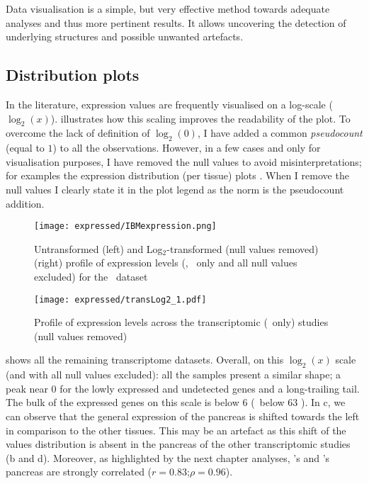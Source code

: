 Data visualisation is a simple, but very effective method
towards adequate analyses and thus more pertinent results.
It allows uncovering the detection of underlying structures
and possible unwanted artefacts.

\subsection{Distribution plots}\label{subsec:distribPlot}
\vspace{-0.2in}
In the literature, expression values are frequently
visualised on a log-scale ($\log_{2}(x)$).
 illustrates how
this scaling improves the readability of the plot.
To overcome the lack of definition of $\log_{2}(0)$,
I have added a common \emph{pseudocount} (equal to $1$)
to all the observations.
However, in a few cases and only for visualisation purposes,
I have removed the null values to avoid misinterpretations;
for examples the expression distribution (per tissue) plots
.
When I remove the null values I clearly state it in the plot legend
as the norm is the pseudocount addition.

\begin{figure}[!htbp]
    \centering
    \texttt{[image: expressed/IBMexpression.png]}
    \caption{Untransformed (left) and Log$_{2}$-transformed (null values removed)
    (right) profile of expression levels (\FPKM, \pcgs\ only and all null values excluded)
    for the \ibm\ dataset}\label{fig:distribPlot}
\end{figure}

\begin{figure}[!htbp]
    \centering
    \texttt{[image: expressed/transLog2\_1.pdf]}
    \caption{Profile of expression levels across the transcriptomic (\pcgs\ only)
    studies (null values removed)
    }\label{fig:distribTrans}
\end{figure}

 shows all the remaining transcriptome datasets.
Overall,
on this $\log_{2}(x)$ scale (and with all null values excluded):
all the samples present a similar shape;
a peak near $0$ for the lowly expressed and undetected genes and a long-trailing tail.
The bulk of the expressed genes on this scale is below $6$ (\ie\ below 63 \FPKM).
In c, we can observe that the general expression
of the pancreas is shifted towards the left in comparison to the other tissues.
This may be an artefact as this shift of the values distribution
is absent in the pancreas of the other transcriptomic studies
(b and d).
Moreover, as highlighted by the next chapter analyses,
\uhlen's and  \gtex's pancreas are strongly
correlated ($r = 0.83$;$\rho = 0.96$).

